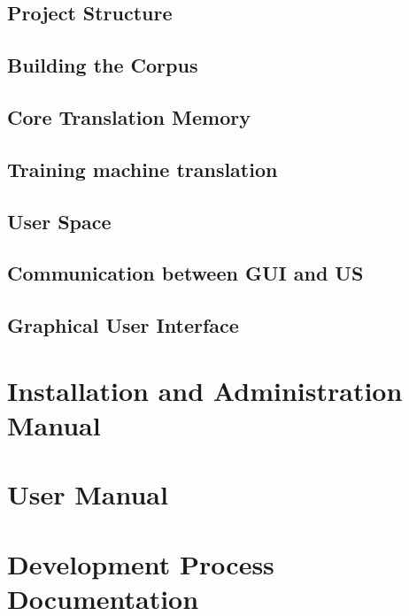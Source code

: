 \documentclass[11pt, oneside]{book}
\begin{document}
\chapter{Project Structure}


%

\chapter{Building the Corpus}


\chapter{Core Translation Memory}


\chapter{Training machine translation}


\chapter{User Space}


\chapter{Communication between GUI and US}


\chapter{Graphical User Interface}


\label{part:manuals}

\part{Installation and Administration Manual}



\part{User Manual}



\part{Development Process Documentation}


\end{document}
